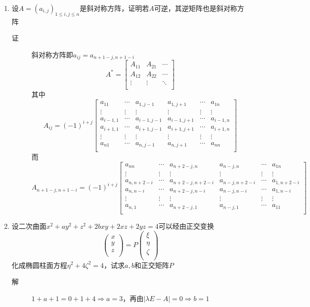 \begin{enumerate}
\item 设$A=(a_{i,j})_{1\leq i,j\leq n}$是斜对称方阵，证明若$A$可逆，其逆矩阵也是斜对称方阵
\begin{description}
\item[证] 斜对称方阵即$a_{ij}=a_{n+1-j,n+1-i}$
\[
A^* = \left[
\begin{array}{ccc}
A_{11} & A_{21} & \cdots\\
A_{12} & A_{22} & \cdots \\
\vdots & \vdots & \ddots \\
\end{array}\right]
\]
其中
\[
A_{ij} = (-1)^{i+j} \left[
\begin{array}{cccccc}
a_{11} & \cdots & a_{1,j-1} & a_{1,j+1} & \cdots & a_{1n}\\
\vdots & \vdots & \vdots & \vdots & \vdots & \vdots\\
a_{i-1,1} & \cdots & a_{i-1,j-1} & a_{i-1,j+1} & \cdots & a_{i-1,n}\\
a_{i+1,1} & \cdots & a_{i+1,j-1} & a_{i+1,j+1} & \cdots & a_{i+1,n}\\
\vdots & \vdots & \vdots & \vdots & \vdots & \vdots\\
a_{n1} & \cdots & a_{n,j-1} & a_{n,j+1} & \cdots & a_{nn}\\
\end{array}\right]
\]
而
\[
A_{n+1-j,n+1-i} = (-1)^{i+j} \left[
\begin{array}{cccccc}
a_{nn} & \cdots & a_{n+2-j,n} & a_{n-j,n} & \cdots & a_{1n}\\
\vdots & \vdots & \vdots & \vdots & \vdots & \vdots\\
a_{n,n+2-i} & \cdots & a_{n+2-j,n+2-i} & a_{n-j,n+2-i} & \cdots & a_{1,n+2-i}\\
a_{n,n-i} & \cdots & a_{n+2-j,n-i} & a_{n-j,n-i} & \cdots & a_{1,n-i}\\
\vdots & \vdots & \vdots & \vdots & \vdots & \vdots\\
a_{n,1} & \cdots & a_{n+2-j,1} & a_{n-j,1} & \cdots & a_{11}\\
\end{array}\right]
\]

\end{description}

\item 设二次曲面$x^2+ay^2+z^2+2bxy+2xz+2yz=4$可以经由正交变换
\[
\left(
\begin{array}{c}
x \\
y \\
z \\
\end{array}\right) = P \left(
\begin{array}{c}
\xi \\
\eta \\
\zeta \\
\end{array}\right)
\]
化成椭圆柱面方程$\eta^2+4\zeta^2=4$，试求$a,b$和正交矩阵$P$
\begin{description}
\item[解] $1+a+1 = 0+1+4 \Rightarrow a = 3$，再由$|\lambda E-A|=0 \Rightarrow b =1$
\end{description}


\end{enumerate}
